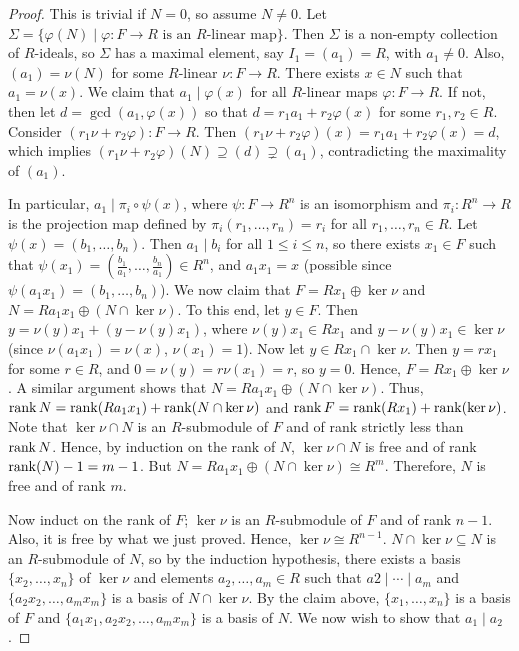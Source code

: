 \begin{proof}
    This is trivial if $N = 0$, so assume $N \neq 0$. Let $\Sigma = \{\varphi(N) \mid \varphi : F \to R \text{ is an } R\text{-linear map}\}$. Then $\Sigma$ is a non-empty collection of $R$-ideals, so $\Sigma$ has a maximal element, say $I_{1} = (a_{1}) = R$, with $a_{1} \neq 0$. Also, $(a_{1}) = \nu(N)$ for some $R$-linear $\nu : F \to R$. There exists $x \in N$ such that $a_{1} = \nu(x)$. We claim that $a_{1} \mid \varphi(x)$ for all $R$-linear maps $\varphi : F \to R$. If not, then let $d = \gcd (a_{1},\varphi(x))$ so that $d = r_{1}a_{1} + r_{2}\varphi(x)$ for some $r_{1},r_{2} \in R$. Consider $(r_{1}\nu + r_{2}\varphi) : F \to R$. Then $(r_{1}\nu + r_{2}\varphi)(x) = r_{1}a_{1} + r_{2}\varphi(x) = d$, which implies $(r_{1}\nu+r_{2}\varphi)(N) \supseteq (d) \supsetneq (a_{1})$, contradicting the maximality of $(a_{1})$.
    
    In particular, $a_{1} \mid \pi_{i} \circ \psi(x)$, where $\psi : F \to R^{n}$ is an isomorphism and $\pi_{i} : R^{n} \to R$ is the projection map defined by $\pi_{i}(r_{1},\ldots,r_{n}) = r_{i}$ for all $r_{1},\ldots,r_{n} \in R$. Let $\psi(x) = (b_{1},\ldots,b_{n})$. Then $a_{1} \mid b_{i}$ for all $1 \leq i \leq n$, so there exists $x_{1} \in F$ such that $\psi(x_{1}) = (\frac{b_{1}}{a_{1}}, \ldots, \frac{b_{n}}{a_{1}}) \in R^{n}$, and $a_{1}x_{1} = x$ (possible since $\psi(a_{1}x_{1}) = (b_{1},\ldots,b_{n})$). We now claim that $F = Rx_{1} \oplus \ker \nu$ and $N = Ra_{1}x_{1} \oplus (N \cap \ker \nu)$. To this end, let $y \in F$. Then $y = \nu(y)x_{1} + (y - \nu(y)x_{1})$, where $\nu(y)x_{1} \in Rx_{1}$ and $y - \nu(y)x_{1} \in \ker \nu$ (since $\nu(a_{1}x_{1}) = \nu(x)$, $\nu(x_{1}) = 1$). Now let $y \in Rx_{1} \cap \ker \nu$. Then $y = rx_{1}$ for some $r \in R$, and $0 = \nu(y) = r\nu(x_{1}) = r$, so $y = 0$. Hence, $F = Rx_{1} \oplus \ker \nu$. A similar argument shows that $N = Ra_{1}x_{1} \oplus (N \cap \ker \nu)$. Thus, $\operatorname{rank} N = \operatorname{rank}(Ra_{1}x_{1}) + \operatorname{rank}(N \cap \ker \nu)$ and $\operatorname{rank} F = \operatorname{rank} (Rx_{1}) + \operatorname{rank}(\ker \nu)$. Note that $\ker \nu \cap N$ is an $R$-submodule of $F$ and of rank strictly less than $\operatorname{rank} N$. Hence, by induction on the rank of $N$, $\ker \nu \cap N$ is free and of rank $\operatorname{rank}(N) - 1 = m-1$. But $N = Ra_{1}x_{1} \oplus (N \cap \ker \nu) \cong R^{m}$. Therefore, $N$ is free and of rank $m$.

    Now induct on the rank of $F$; $\ker \nu$ is an $R$-submodule of $F$ and of rank $n-1$. Also, it is free by what we just proved. Hence, $\ker \nu \cong R^{n-1}$. $N \cap \ker \nu \subseteq N$ is an $R$-submodule of $N$, so by the induction hypothesis, there exists a basis $\{x_{2},\ldots,x_{n}\}$ of $\ker \nu$ and elements $a_{2},\ldots,a_{m} \in R$ such that $a{2} \mid \cdots \mid a_{m}$ and $\{a_{2}x_{2},\ldots,a_{m}x_{m}\}$ is a basis of $N \cap \ker \nu$. By the claim above, $\{x_{1},\ldots,x_{n}\}$ is a basis of $F$ and $\{a_{1}x_{1},a_{2}x_{2},\ldots,a_{m}x_{m}\}$ is a basis of $N$. We now wish to show that $a_{1} \mid a_{2}$.


\end{proof}
